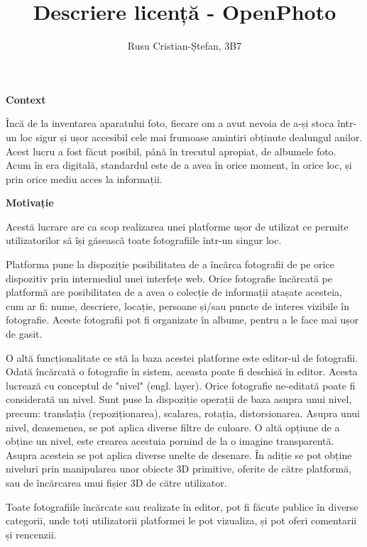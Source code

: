 \documentclass[a4paper,10pt]{article}
\title{Descriere licență - OpenPhoto}
\author{Rusu Cristian-Ștefan, 3B7}
\date{}
\begin{document}
\maketitle

\medskip

\large
\textbf{Context}\\
\normalsize

Încă de la inventarea aparatului foto, fiecare om a avut nevoia de a-și stoca într-un loc sigur și ușor accesibil cele mai frumoase 
amintiri obținute dealungul anilor. Acest lucru a fost făcut posibil, până în trecutul apropiat, de albumele foto. Acum în era digitală, 
standardul este de a avea în orice moment, în orice loc, și prin orice mediu acces la informații. 

\medskip
\large
\textbf{Motivație}\\
\normalsize

Acestă lucrare are ca scop realizarea unei platforme ușor de utilizat ce permite utilizatorilor să își găsească toate fotografiile într-un 
singur loc.

Platforma pune la dispoziție posibilitatea de a încărca fotografii de pe orice dispozitiv prin intermediul unei interfețe web. Orice 
fotografie încărcată pe platformă are posibilitatea de a avea o colecție de informații atașate acesteia, cum ar fi: nume, descriere,
 locație, persoane și/sau puncte de interes vizibile în fotografie. Aceste fotografii pot fi organizate în albume, pentru a le face mai 
ușor de gasit.

O altă funcționalitate ce stă la baza acestei platforme este editor-ul de fotografii. Odată încărcată o fotografie în sistem, aceasta 
poate fi deschisă în editor. Acesta lucrează cu conceptul de "nivel" (engl. layer). Orice fotografie ne-editată poate fi considerată un 
nivel. Sunt puse la dispoziție operații de baza asupra unui nivel, precum: translația (repoziționarea), scalarea, rotația, distorsionarea.
 Asupra unui nivel, deasemenea, se pot aplica diverse filtre de culoare. O altă opțiune de a obține un nivel, este crearea acestuia 
pornind de la o imagine transparentă. Asupra acesteia se pot aplica diverse unelte de desenare. În adiție se pot obține niveluri prin 
manipularea unor obiecte 3D primitive, oferite de către platformă, sau de încărcarea unui fișier 3D de către utilizator.

Toate fotografiile încărcate sau realizate în editor, pot fi făcute publice în diverse categorii, unde toți utilizatorii platformei le pot 
vizualiza, și pot oferi comentarii și rencenzii. 

\end{document}
